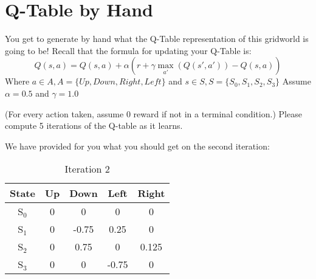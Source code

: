 \documentclass{exam}
\begin{document}
\section{Q-Table by Hand}
You get to generate by hand what the Q-Table representation of this gridworld is going to be! Recall that the formula for updating your Q-Table is:
\begin{equation*}
    Q(s,a) = Q(s,a) + \alpha(r + \gamma \max_{a'}(Q(s',a')) - Q(s,a))
\end{equation*}
Where $a \in A, A = \{Up, Down, Right, Left\}$ and $s \in S, S = \{S_0, S_1, S_2, S_3\}$
Assume $\alpha = 0.5$ and $\gamma = 1.0$

(For every action taken, assume 0 reward if not in a terminal condition.)
Please compute 5 iterations of the Q-table as it learns.

\begin{figure}[h]
\centering
{} %
\end{figure}

We have provided for you what you should get on the second iteration:  

\begin{table}[H] %
\centering
\begin{tabular}{c|c|c|c|c}
\textbf{State} & \textbf{Up} & \textbf{Down} & \textbf{Left} & \textbf{Right} \\
\hline
S$_0$ & 0 & 0 & 0 & 0 \\
S$_1$ & 0 & -0.75 & 0.25 & 0 \\
S$_2$ & 0 & 0.75 & 0 & 0.125 \\
S$_3$ & 0 & 0 & -0.75 & 0 \\
\end{tabular}
\caption{Iteration 2}
\end{table}
\end{document}
